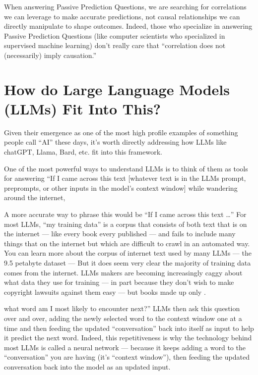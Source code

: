 \documentclass[letterpaper,10pt,english]{jupyterBook}
\begin{document}
\sphinxAtStartPar
When answering Passive Prediction Questions, we are searching for correlations we can leverage to make accurate predictions, not causal relationships we can directly manipulate to shape outcomes. Indeed, those who specialize in answering Passive Prediction Questions (like computer scientists who specialized in supervised machine learning) don’t really care that “correlation does not (necessarily) imply causation.”

\sphinxAtStartPar
{}


\section{How do Large Language Models (LLMs) Fit Into This?}
\label{\detokenize{30_questions/20_using_passive_prediction_questions:how-do-large-language-models-llms-fit-into-this}}
\sphinxAtStartPar
Given their emergence as one of the most high profile examples of something people call “AI” these days, it’s worth directly addressing how LLMs like chatGPT, Llama, Bard, etc. fit into this framework.

\sphinxAtStartPar
One of the most powerful ways to understand LLMs is to think of them as tools for answering “If I came across this text {[}whatever text is in the LLMs prompt, pre\sphinxhyphen{}prompts, or other inputs in the model’s context window{]} while wandering around the internet,%
\begin{footnote}[1]\sphinxAtStartFootnote
A more accurate way to phrase this would be “If I came across this text …” For most LLMs, “my training data” is a corpus that consists of both text that is  on the internet — like every book every published — and fails to include many things that  on the internet but which are difficult to crawl in an automated way. You can learn more about the corpus of internet text used by many LLMs — the 9.5 petabyte  dataset —  But it does seem very clear the  majority of training data comes from the internet. LLMs makers are becoming increasingly caggy about what data they use for training — in part because they don’t wish to make copyright lawsuits against them  easy — but books made up only .
%
\end{footnote} what word am I most likely to encounter next?” LLMs then ask this question over and over, adding the newly selected word to the context window one at a time and then feeding the updated “conversation” back into itself as input to help it predict the next word. Indeed, this repetitiveness is why the technology behind most LLMs is called a  neural network — because it keeps adding a word to the “conversation” you are having (it’s “context window”), then feeding the updated conversation back into the model as an updated input.
\end{document}
